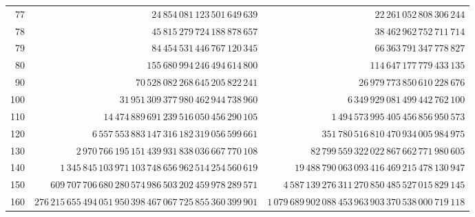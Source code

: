 {\begin{tabular}{rrr}
77 & {\footnotesize $24\,854\,081\,123\,501\,649\,639$} & {\footnotesize $22\,261\,052\,808\,306\,244$}\\
78 & {\footnotesize $45\,815\,279\,724\,188\,878\,657$} & {\footnotesize $38\,462\,962\,752\,711\,714$}\\
79 & {\footnotesize $84\,454\,531\,446\,767\,120\,345$} & {\footnotesize $66\,363\,791\,347\,778\,827$}\\
80 & {\footnotesize $155\,680\,994\,246\,494\,614\,800$} & {\footnotesize $114\,647\,177\,779\,433\,135$}\\
90 & {\footnotesize $70\,528\,082\,268\,645\,205\,822\,241$} & {\footnotesize $26\,979\,773\,850\,610\,228\,676$}\\
100 & {\footnotesize $31\,951\,309\,377\,980\,462\,944\,738\,960$} & {\footnotesize $6\,349\,929\,081\,499\,442\,762\,100$}\\
110 & {\footnotesize $14\,474\,889\,691\,239\,516\,050\,456\,290\,105$} & {\footnotesize $1\,494\,573\,995\,405\,456\,856\,950\,573$}\\
120 & {\footnotesize $6\,557\,553\,883\,147\,316\,182\,319\,056\,599\,661$} & {\footnotesize $351\,780\,516\,810\,470\,934\,005\,984\,975$}\\
130 & {\footnotesize $2\,970\,766\,195\,151\,439\,931\,838\,036\,667\,770\,108$} & {\footnotesize $82\,799\,559\,322\,022\,867\,662\,771\,980\,605$}\\
140 & {\footnotesize $1\,345\,845\,103\,971\,103\,748\,656\,962\,514\,254\,560\,619$} & {\footnotesize $19\,488\,790\,063\,093\,416\,469\,215\,478\,130\,947$}\\
150 & {\footnotesize $609\,707\,706\,680\,280\,574\,986\,503\,202\,459\,978\,289\,571$} & {\footnotesize $4\,587\,139\,276\,311\,270\,850\,485\,527\,015\,829\,145$}\\
160 & {\footnotesize $276\,215\,655\,494\,051\,950\,398\,467\,067\,725\,855\,360\,399\,901$} & {\footnotesize $1\,079\,689\,902\,088\,453\,963\,903\,370\,538\,000\,719\,118$}\\
\bottomrule\end{tabular}}
\newcommand{\tablemod}{\begin{tabular}{rrr}\toprule $n$ & $m(n)$ & $m_{\mathrm{vi}}(n)$\\\midrule
33 & $48\,496\,079\,939$ & $6\,579\,923\,491$\\
34 & $116\,905\,715\,114$ & $15\,777\,658\,535$\\
35 & $282\,098\,869\,730$ & $37\,871\,501\,929$\\
36 & $681\,357\,605\,302$ & $90\,998\,884\,153$\\
37 & $1\,647\,135\,247\,659$ & $218\,856\,768\,070$\\
38 & $3\,985\,106\,742\,170$ & $526\,836\,817\,969$\\
\bottomrule\end{tabular}}
